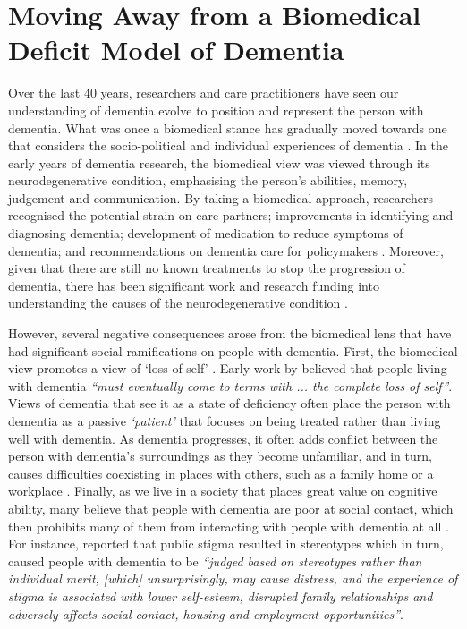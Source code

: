 \section{Moving Away from a Biomedical Deficit Model of Dementia}
\label{BL:DementiaHCI}
Over the last 40 years, researchers and care practitioners have seen our understanding of dementia evolve to position and represent the person with dementia. What was once a biomedical stance has gradually moved towards one that considers the socio-political and individual experiences of dementia \citep{bellass_broadening_2019}. In the early years of dementia research, the biomedical view was viewed through its neurodegenerative condition, emphasising the person's abilities, memory, judgement and communication. By taking a biomedical approach, researchers recognised the potential strain on care partners; improvements in identifying and diagnosing dementia; development of medication to reduce symptoms of dementia; and recommendations on dementia care for policymakers \citep{doi:10.1080/13607863.2019.1693968}. Moreover, given that there are still no known treatments to stop the progression of dementia, there has been significant work and research funding into understanding the causes of the neurodegenerative condition \citep{bature_signs_2017}.

However, several negative consequences arose from the biomedical lens that have had significant social ramifications on people with dementia. First, the biomedical view promotes a view of `loss of self' \citep{ryan_dementia_2009}. Early work by \cite{cohen_loss_1986} believed that people living with dementia \textit{``must eventually come to terms with ... the complete loss of self''}. Views of dementia that see it as a state of deficiency often place the person with dementia as a passive \textit{`patient'} that focuses on being treated rather than living well with dementia. As dementia progresses, it often adds conflict between the person with dementia's surroundings as they become unfamiliar, and in turn, causes difficulties coexisting in places with others, such as a family home or a workplace \citep{langdon_making_2007}. Finally, as we live in a society that places great value on cognitive ability, many believe that people with dementia are poor at social contact, which then prohibits many of them from interacting with people with dementia at all \citep{killick_communication_2001}. For instance, \cite{mukadam2012reducing} reported that public stigma resulted in stereotypes which in turn, caused people with dementia to be \textit{``judged based on stereotypes rather than individual merit, [which] unsurprisingly, may cause distress, and the experience of stigma is associated with
lower self-esteem, disrupted family relationships
and adversely affects social contact, housing and
employment opportunities''}.

